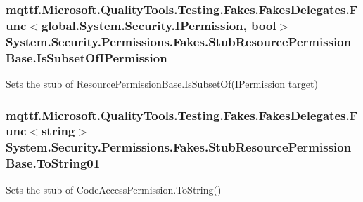 \hypertarget{class_system_1_1_security_1_1_permissions_1_1_fakes_1_1_stub_resource_permission_base_ae34a991186dd822d0f7ff5dbc7c9f17f}{
\subsubsection[{Is\-Subset\-Of\-I\-Permission}]{\setlength{\rightskip}{0pt plus 5cm}mqttf.\-Microsoft.\-Quality\-Tools.\-Testing.\-Fakes.\-Fakes\-Delegates.\-Func$<$global.\-System.\-Security.\-I\-Permission, bool$>$ System.\-Security.\-Permissions.\-Fakes.\-Stub\-Resource\-Permission\-Base.\-Is\-Subset\-Of\-I\-Permission}}\label{class_system_1_1_security_1_1_permissions_1_1_fakes_1_1_stub_resource_permission_base_ae34a991186dd822d0f7ff5dbc7c9f17f}


Sets the stub of Resource\-Permission\-Base.\-Is\-Subset\-Of(\-I\-Permission target)

\hypertarget{class_system_1_1_security_1_1_permissions_1_1_fakes_1_1_stub_resource_permission_base_adb8fc9bbc7d691b8b849f16e8893f133}{
\subsubsection[{To\-String01}]{\setlength{\rightskip}{0pt plus 5cm}mqttf.\-Microsoft.\-Quality\-Tools.\-Testing.\-Fakes.\-Fakes\-Delegates.\-Func$<$string$>$ System.\-Security.\-Permissions.\-Fakes.\-Stub\-Resource\-Permission\-Base.\-To\-String01}}\label{class_system_1_1_security_1_1_permissions_1_1_fakes_1_1_stub_resource_permission_base_adb8fc9bbc7d691b8b849f16e8893f133}


Sets the stub of Code\-Access\-Permission.\-To\-String()

